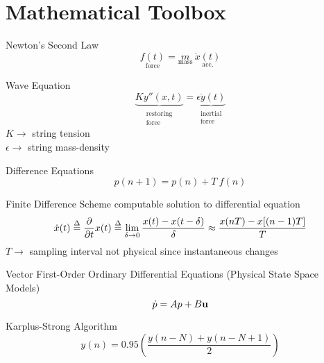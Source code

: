 \documentclass{beamer}
\newcommand{\arr}{\ensuremath{\longrightarrow}}
\begin{document}
\section{Mathematical Toolbox}

\begin{frame}{Newton's Second Law}
\[
\underset{\text{force}}{f(t)} = \underset{\text{mass}}{m} \ \underset{\text{acc.}}{\ddot x(t)}
\]
\end{frame}

\begin{frame}{Wave Equation}
\[\underbrace{K y''(x,t)}_{\substack{\text{restoring} \\ \text{force}}} = \underbrace{\epsilon \ddot y (t)}_{\substack{\text{inertial} \\ \text{force}}} \]
$K \arr$ string tension
\\ $\epsilon \arr$ string mass-density
\end{frame}

\begin{frame}{Difference Equations}
\[
p(n+1) = p(n) + T \ f(n)
\]
\end{frame}

\begin{frame}{Finite Difference Scheme}
computable solution to differential equation
\[
\dot x (t) \overset{\Delta}{=} \pdv{t} x(t) \overset{\Delta}{=} \lim _{\delta \to 0} \frac{x(t) - x(t - \delta )}{\delta} \approx \frac{x(nT) - x [(n-1)T]}{T}
\]
$T \arr$ sampling interval
not physical since instantaneous changes 
\end{frame}

\begin{frame}{Vector First-Order Ordinary Differential Equations}
(Physical State Space Models)
\[
\dot p = A p + B \vb u
\]
\end{frame}

\begin{frame}{Karplus-Strong Algorithm}
\[
y(n) = 0.95 \left( \frac{y(n-N) + y(n-N+1)}{2} \right)
\]
\end{frame}
\end{document}
